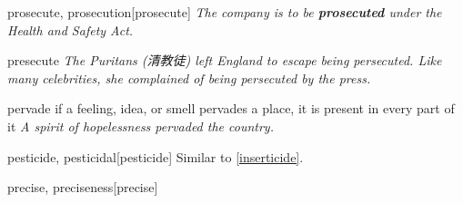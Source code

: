 \begin{word}{prosecute, prosecution}[prosecute]
    \textit{The company is to be \textbf{prosecuted} under the Health and Safety Act.}
\end{word}

\begin{word}{presecute}
    \textit{The Puritans (清教徒) left England to escape being persecuted. Like many celebrities, she complained of being persecuted by the press.}
\end{word}

\begin{word}{pervade}
    if a feeling, idea, or smell pervades a place, it is present in every part of it
    \textit{A spirit of hopelessness pervaded the country.}
\end{word}

\begin{word}{pesticide, pesticidal}[pesticide]
    Similar to \ref{inserticide}.
\end{word}


\begin{word}{precise, preciseness}[precise]
\end{word}